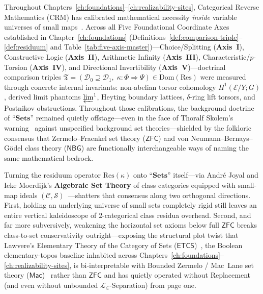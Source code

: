 Throughout Chapters~\ref{ch:foundations}--\ref{ch:realizability-sites}, Categorical Reverse Mathematics ($\mathrm{CRM}$) has calibrated mathematical necessity \emph{inside} variable universes of small maps~\cite{Lawvere69,Johnstone02}. Across all Five Foundational Coordinate Axes established in Chapter~\ref{ch:foundations} (Definitions~\ref{def:comparison-triple}--\ref{def:residuum} and Table~\ref{tab:five-axis-master})---Choice/Splitting (\textbf{Axis~I}), Constructive Logic (\textbf{Axis~II}), Arithmetic Infinity (\textbf{Axis~III}), Characteristic/$p$-Torsion (\textbf{Axis~IV}), and Directional Invertibility (\textbf{Axis~V})---doctrinal comparison triples $\mathfrak{T} = (\mathcal{D}_0 \supseteq \mathcal{D}_1,\; \kappa : \Phi \Rightarrow \Psi) \in \mathrm{Dom}(\mathrm{Res})$ were measured through concrete internal invariants: non-abelian torsor cohomology $H^1(\mathcal{E}/Y; G)$, derived limit phantoms $\varprojlim^1$, Heyting boundary lattices, $\delta$-ring lift torsors, and Postnikov obstructions. Throughout those calibrations, the background doctrine of ``$\mathbf{Sets}$'' remained quietly offstage---even in the face of Thoralf Skolem's warning~\cite{Skolem55} against unspecified background set theories---shielded by the folkloric consensus that Zermelo--Fraenkel set theory ($\mathsf{ZFC}$) and von Neumann--Bernays--G\"odel class theory ($\mathsf{NBG}$) are functionally interchangeable ways of naming the same mathematical bedrock.

Turning the residuum operator $\mathrm{Res}(\kappa)$ onto ``$\mathbf{Sets}$'' itself---via Andr\'e Joyal and Ieke Moerdijk's \textbf{Algebraic Set Theory} of class categories equipped with small-map ideals $(\mathcal{C}, \mathcal{S})$~\cite{JoyalMoerdijk95}---shatters that consensus along two orthogonal directions. First, holding an underlying universe of small sets completely rigid still leaves an entire vertical kaleidoscope of $2$-categorical class residua overhead. Second, and far more subversively, weakening the horizontal set axioms below full $\mathsf{ZFC}$ breaks class-to-set conservativity outright---exposing the structural plot twist that Lawvere's Elementary Theory of the Category of Sets ($\mathsf{ETCS}$)~\cite{Lawvere64}, the Boolean elementary-topos baseline inhabited across Chapters~\ref{ch:foundations}--\ref{ch:realizability-sites}, is bi-interpretable with Bounded Zermelo / Mac~Lane set theory ($\mathsf{Mac}$)~\cite{Cole73,Mitchell72,Osius74} rather than $\mathsf{ZFC}$ and has quietly operated without Replacement (and even without unbounded $\mathcal{L}_\in$-Separation) from page one.

